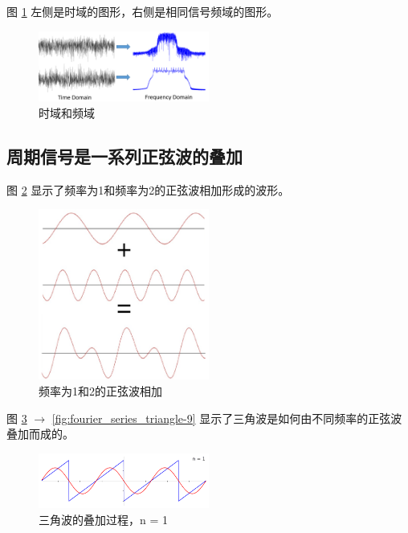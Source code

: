 \documentclass[lang=cn,newtx,10pt,scheme=chinese]{elegantbook}
\begin{document}
图 \ref{fig:time_and_freq_domain_example_signals} 左侧是时域的图形，右侧是相同信号频域的图形。

\begin{figure}[!htb]
\centering
\includegraphics[width=0.5\textwidth]{time_and_freq_domain_example_signals.png}
\caption{时域和频域}
\label{fig:time_and_freq_domain_example_signals}
\end{figure}

\subsection{周期信号是一系列正弦波的叠加}

图 \ref{fig:summing_sinusoids} 显示了频率为1和频率为2的正弦波相加形成的波形。

\begin{figure}[!htb]
\centering
\includegraphics[width=0.5\textwidth]{summing_sinusoids.pdf}
\caption{频率为1和2的正弦波相加}
\label{fig:summing_sinusoids}
\end{figure}

图 \ref{fig:fourier_series_triangle-0} $\rightarrow$ \ref{fig:fourier_series_triangle-9} 显示了三角波是如何由不同频率的正弦波叠加而成的。

\begin{figure}[!htb]
\centering
\includegraphics[width=0.5\textwidth]{fourier_series_triangle-0.png}
\caption{三角波的叠加过程，n = 1}
\label{fig:fourier_series_triangle-0}
\end{figure}
\end{document}
